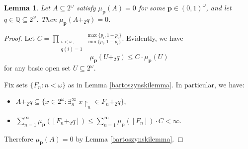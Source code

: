 \documentclass{amsart}
\theoremstyle{plain}
\newtheorem*{lemma*}{Lemma}
\theoremstyle{definition}
\theoremstyle{remark}
\numberwithin{equation}{section}
\newcommand{\Q}{\mathbb{Q}}
\newcommand{\s}{\subseteq}
\begin{document}
\begin{lemma*}
    Let  $A\s 2^\omega$ satisfy $\mu_{\textbf{p}}(A)=0$ for some $\textbf{p} \in (0,1)^\omega$, and let $q \in \Q \subseteq 2^\omega$. Then $\mu_{\textbf{p}}(A +_2 q)=0$.
\end{lemma*}

\begin{proof}
    Let $C=\prod\limits_{\substack{i<\omega, \\ q(i)=1}}{\frac{\max\{p_i,1-p_i\}}{\min\{p_i,1-p_i\}}}$. Evidently, we have
    $$\mu_{\textbf{p}}(U+_2q) \leqslant C\cdot \mu_{\textbf{p}}(U)$$
    for any basic open set $ U \s 2^\omega$. 
    
    Fix sets $\{F_n : n<\omega\}$ as in Lemma \ref{bartoszynskilemma}. In particular, we have:
    \begin{itemize}
        \item $A+_2q \s \{x \in 2^\omega : \exists_n^\infty \; x \restriction_n \in F_n+_2q \}$,
        \item $\sum\limits_{n=1}^{\infty}\mu_{\textbf{p}}([F_n+_2q]) \leqslant \sum\limits_{n=1}^{\infty}\mu_{\textbf{p}}([F_n])\cdot C<\infty$.
    \end{itemize}
    Therefore $\mu_{\textbf{p}}(A)=0$ by Lemma \ref{bartoszynskilemma}.
\end{proof}
\end{document}
